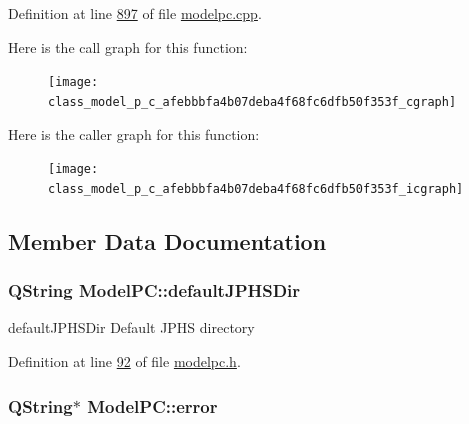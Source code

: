 Definition at line \hyperlink{modelpc_8cpp_source_l00897}{897} of file \hyperlink{modelpc_8cpp_source}{modelpc.\+cpp}.



Here is the call graph for this function\+:
\nopagebreak
\begin{figure}[H]
\begin{center}
\leavevmode
\texttt{[image: class\_model\_p\_c\_afebbbfa4b07deba4f68fc6dfb50f353f\_cgraph]}
\end{center}
\end{figure}




Here is the caller graph for this function\+:
\nopagebreak
\begin{figure}[H]
\begin{center}
\leavevmode
\texttt{[image: class\_model\_p\_c\_afebbbfa4b07deba4f68fc6dfb50f353f\_icgraph]}
\end{center}
\end{figure}




\subsection{Member Data Documentation}
\subsubsection[{\texorpdfstring{default\+J\+P\+H\+S\+Dir}{defaultJPHSDir}}]{\setlength{\rightskip}{0pt plus 5cm}Q\+String Model\+P\+C\+::default\+J\+P\+H\+S\+Dir}\hypertarget{class_model_p_c_abd038306f14f22fb885a1697c96d6335}{}\label{class_model_p_c_abd038306f14f22fb885a1697c96d6335}


default\+J\+P\+H\+S\+Dir Default J\+P\+HS directory 



Definition at line \hyperlink{modelpc_8h_source_l00092}{92} of file \hyperlink{modelpc_8h_source}{modelpc.\+h}.

\subsubsection[{\texorpdfstring{error}{error}}]{\setlength{\rightskip}{0pt plus 5cm}Q\+String$\ast$ Model\+P\+C\+::error\hspace{0.3cm}{\ttfamily [protected]}}\hypertarget{class_model_p_c_a4e5a9c0ca1f06fe5bc478b6bf248c37c}{}\label{class_model_p_c_a4e5a9c0ca1f06fe5bc478b6bf248c37c}


